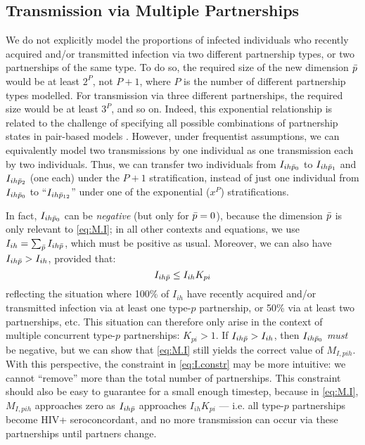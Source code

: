 \subsection{Transmission via Multiple Partnerships}\label{foi.prop.mp}
We do not explicitly model the proportions of infected individuals
who recently acquired and/or transmitted infection via
two different partnership types, or two partnerships of the same type.
To do so, the required size of the new dimension $\bar{p}$ would be at least $2^{P}$, not $P+1$,
where $P$ is the number of different partnership types modelled.
For transmission via three different partnerships,
the required size would be at least $3^{P}$, and so on.
Indeed, this exponential relationship is related to the challenge of specifying
all possible combinations of partnership states in pair-based models \cite{Kretzschmar2017}.
However, under frequentist assumptions, we can equivalently model
two transmissions by one individual as one transmission each by two individuals.
Thus, we can transfer two individuals from $I_{ih\bar{p}_0}$ to
$I_{ih\bar{p}_1}$ and $I_{ih\bar{p}_2}$ (one each) under the $P+1$ stratification,
instead of just one individual from $I_{ih\bar{p}_0}$ to
``$I_{ih\bar{p}_{12}}$'' under one of the exponential ($x^P$) stratifications.
\par
In fact, $I_{ih\bar{p}_0}$ can be \emph{negative} (but only for $\bar{p} = 0$),
because the dimension $\bar{p}$ is only relevant to \eqref{eq:M.I};
in all other contexts and equations,
we use $I_{ih} = \sum_{\bar{p}} I_{ih\bar{p}}$, which must be positive as usual.
Moreover, we can also have $I_{ih\bar{p}} > I_{ih}$, provided that:
\begin{equation}\label{eq:I.constr}
  I_{ih\bar{p}} \le I_{ih} K_{pi}
\end{equation}
reflecting the situation where 100\% of $I_{ih}$
have recently acquired and/or transmitted infection via at least one type-$p$ partnership,
or 50\% via at least two partnerships, etc.
This situation can therefore only arise in the context of
multiple concurrent type-$p$ partnerships: $K_{pi} > 1$.
If $I_{ih\bar{p}} > I_{ih}$, then $I_{ih\bar{p}_0}$ \emph{must} be negative,
but we can show that \eqref{eq:M.I} still yields the correct value of $M_{I,pih}$.
With this perspective, the constraint in \eqref{eq:I.constr} may be more intuitive:
we cannot ``remove'' more than the total number of partnerships.
This constraint should also be easy to guarantee for a small enough timestep,
because in \eqref{eq:M.I}, $M_{I,pih}$ approaches zero as $I_{ih\bar{p}}$ approaches $I_{ih} K_{pi}$
--- i.e. all type-$p$ partnerships become HIV+ seroconcordant,
and no more transmission can occur via these partnerships until partners change.
